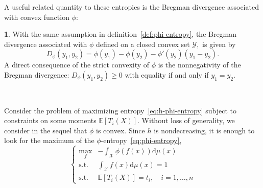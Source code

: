 \documentclass[english]{elsarticle}
\theoremstyle{definition}
\newtheorem{defn}{\protect\definitionname}
\theoremstyle{plain}
\theoremstyle{plain}
\def\dmu{\mathrm{d}\mu}
\def\X{\mathcal{X}}
\def\Y{\mathcal{Y}}
\newcommand{\Esp}[1]{\mathbb{E}\left[ #1 \right]}
\providecommand{\definitionname}{Definition}
\begin{document}
A  useful  related  quantity  to  these  entropies  is  the  Bregman  divergence
associated with convex function $\phi$:
\begin{defn}\label{def:Bregman}
  With  the  same assumption  in  definition~\ref{def:phi-entropy}, the  Bregman
  divergence  associated with $\phi$  defined on  a closed  convex set  $\Y,$ is
  given by
  \begin{equation}\label{eq:Bregman}
    D_\phi(y_1,y_2) = \phi(y_1) - \phi(y_2) - \phi'(y_2) \left(y_1-y_2\right).
  \end{equation}
  A direct consequence of the strict convexity of $\phi$ is the nonnegativity of
  the Bregman divergence:  $D_\phi(y_1,y_2) \ge 0$ with equality  if and only if
  $y_1 = y_2$.
\end{defn}

\

Consider the  problem of maximizing  entropy~\eqref{eq:h-phi-entropy} subject to
constraints  on some  moments  $\Esp{T_i(X)}$. Without  loss  of generality,  we
consider in the sequel that $\phi$ is convex.  Since $h$ is nondecreasing, it is
enough to look for the maximum of the $\phi$-entropy~\eqref{eq:phi-entropy},
\begin{equation}\label{eq:MaxEnt}
\begin{cases}
\max_f & {\displaystyle -\int_\X \phi(f(x)) \dmu(x)}\\[5mm]
\text{s.t. } & {\displaystyle \int_\X f(x) \dmu(x) = 1}\\[5mm]
\text{s.t. } & \Esp{T_i(X)} = t_i, \quad i=1,\ldots,n
\end{cases}
\end{equation}
\end{document}
